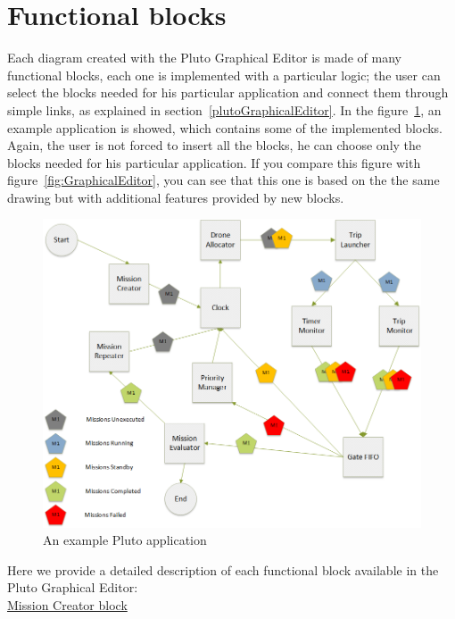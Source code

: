 \section{Functional blocks}
\label{descriptionOfModel}

Each diagram created with the Pluto Graphical Editor is made of many functional blocks, each one is implemented with a particular logic; the user can select the blocks needed for his particular application and connect them through simple links, as explained in section~\ref{plutoGraphicalEditor}.
In the figure~\ref{fig:BlocksDiagram}, an example application is showed, which contains some of the implemented blocks.
Again, the user is not forced to insert all the blocks, he can choose only the blocks needed for his particular application.
If you compare this figure with figure~\ref{fig:GraphicalEditor}, you can see that this one is based on the the same drawing but with additional features provided by new blocks.
\\

\begin{figure}[htb]
  \centering
  \includegraphics[width=\linewidth]{pictures/BlocksDiagram.png}
  \caption{An example Pluto application}
  \label{fig:BlocksDiagram}
\end{figure}


Here we provide a detailed description of each functional block available in the Pluto Graphical Editor:
\\

\underline{Mission Creator block}
\\

